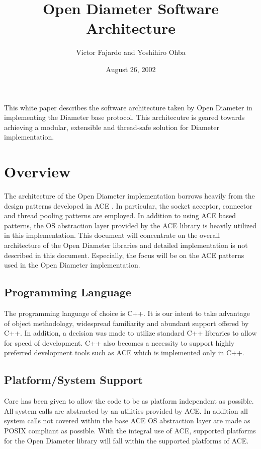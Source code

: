 \documentclass{article}
\begin{document}
\title{Open Diameter Software Architecture}
\author{Victor Fajardo and Yoshihiro Ohba}
\date{August 26, 2002}
\maketitle

This white paper describes the software architecture taken by Open
Diameter in implementing the Diameter base protocol\cite{basep}.  This
architecutre is geared towards achieving a modular, extensible and
thread-safe solution for Diameter implementation.

\tableofcontents
{}
\pagebreak

\section{Overview\label{sec:overview}}

The architecture of the Open Diameter implementation borrows heavily
from the design patterns developed in ACE \cite{ace}. In particular, the
socket acceptor, connector and thread pooling patterns are employed. In
addition to using ACE based patterns, the OS abstraction layer provided
by the ACE library is heavily utilized in this implementation. This
document will concentrate on the overall architecture of the Open
Diameter libraries and detailed implementation is not described in this
document.  Especially, the focus will be on the ACE patterns used in the
Open Diameter implementation.

\subsection{Programming Language\label{sec:language}}

The programming language of choice is C++. It is our intent to take
advantage of object methodology, widespread familiarity and abundant
support offered by C++. In addition, a decision was made to utilize
standard C++ libraries to allow for speed of development.  C++ also
becomes a necessity to support highly preferred development tools such
as ACE which is implemented only in C++.

\subsection{Platform/System Support\label{sec:platform}}

Care has been given to allow the code to be as platform independent as
possible. All system calls are abstracted by an utilities provided by
ACE. In addition all system calls not covered within the base ACE OS
abstraction layer are made as POSIX compliant as possible. With the
integral use of ACE, supported platforms for the Open Diameter library
will fall within the supported platforms of ACE.
\end{document}
